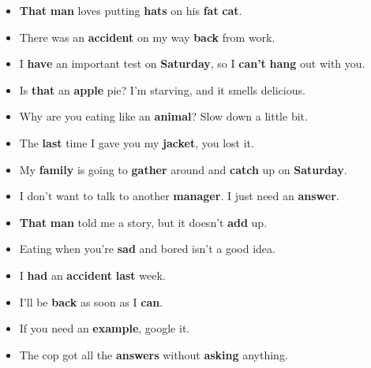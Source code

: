 \begin{itemize}
  \item \textbf{Th\textcolor{fancyorange}{a}t} \textbf{m\textcolor{fancyorange}{a}n} loves putting \textbf{h\textcolor{fancyorange}{a}ts} on his \textbf{f\textcolor{fancyorange}{a}t} \textbf{c\textcolor{fancyorange}{a}t}.
  \item There was an \textbf{\textcolor{fancyorange}{a}ccident} on my way \textbf{b\textcolor{fancyorange}{a}ck} from work.
  \item I \textbf{h\textcolor{fancyorange}{a}ve} an important test on \textbf{S\textcolor{fancyorange}{a}turday}, so I \textbf{c\textcolor{fancyorange}{a}n't} \textbf{h\textcolor{fancyorange}{a}ng} out with you.
  \item Is \textbf{th\textcolor{fancyorange}{a}t} an \textbf{\textcolor{fancyorange}{a}pple} pie? I'm starving, and it smells delicious.
  \item Why are you eating like an \textbf{\textcolor{fancyorange}{a}nimal}? Slow down a little bit.
  \item The \textbf{l\textcolor{fancyorange}{a}st} time I gave you my \textbf{j\textcolor{fancyorange}{a}cket}, you lost it.
  \item My \textbf{f\textcolor{fancyorange}{a}mily} is going to \textbf{g\textcolor{fancyorange}{a}ther} around and \textbf{c\textcolor{fancyorange}{a}tch} up on \textbf{S\textcolor{fancyorange}{a}turday}.
  \item I don't want to talk to another \textbf{m\textcolor{fancyorange}{a}nager}. I just need an \textbf{\textcolor{fancyorange}{a}nswer}.
  \item \textbf{Th\textcolor{fancyorange}{a}t} \textbf{m\textcolor{fancyorange}{a}n} told me a story, but it doesn't \textbf{\textcolor{fancyorange}{a}dd} up.
  \item Eating when you're \textbf{s\textcolor{fancyorange}{a}d} and bored isn't a good idea.
  \item I \textbf{h\textcolor{fancyorange}{a}d} an \textbf{\textcolor{fancyorange}{a}ccident} \textbf{l\textcolor{fancyorange}{a}st} week.
  \item I'll be \textbf{b\textcolor{fancyorange}{a}ck} as soon as I \textbf{c\textcolor{fancyorange}{a}n}.
  \item If you need an \textbf{ex\textcolor{fancyorange}{a}mple}, google it.
  \item The cop got all the \textbf{\textcolor{fancyorange}{a}nswers} without \textbf{\textcolor{fancyorange}{a}sking} anything.
\end{itemize}

\newpage